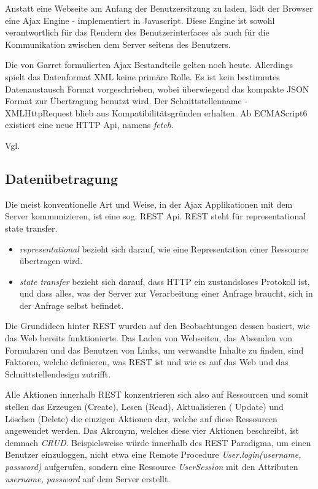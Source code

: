 Anstatt eine Webseite am Anfang der Benutzersitzung zu laden, lädt der Browser eine Ajax Engine - implementiert in Javascript. Diese Engine ist sowohl verantwortlich für das Rendern des Benutzerinterfaces als auch für die Kommunikation zwischen dem Server seitens des Benutzers.

Die von Garret formulierten Ajax Bestandteile gelten noch heute. Allerdings spielt das Datenformat XML keine primäre Rolle. Es ist kein bestimmtes Datenaustausch Format vorgeschrieben, wobei überwiegend das kompakte JSON Format zur Übertragung benutzt wird. Der Schnittstellenname - XMLHttpRequest blieb aus Kompatibilitätsgründen erhalten. Ab ECMAScript6 existiert eine neue HTTP Api, namens \emph{fetch}.

Vgl. \cite{Garrett:2005}

\subsection{Datenübetragung}

Die meist konventionelle Art und Weise, in der Ajax Applikationen mit dem Server kommunizieren, ist eine sog. REST Api. REST steht für representational state transfer.

\begin{itemize}
\item \emph{representational} bezieht sich darauf, wie eine Representation einer Ressource übertragen wird.
\item \emph{state transfer} bezieht sich darauf, dass HTTP ein zustandsloses Protokoll ist, und dass alles, was der Server zur Verarbeitung einer Anfrage braucht, sich in der Anfrage selbst befindet.
\end{itemize}

Die Grundideen hinter REST wurden auf den Beobachtungen dessen basiert, wie das Web bereits funktionierte. Das Laden von Webseiten, das Absenden von Formularen und das Benutzen von Links, um verwandte Inhalte zu finden, sind Faktoren, welche definieren, was REST ist und wie es auf das Web und das Schnittstellendesign zutrifft.

Alle Aktionen innerhalb REST konzentrieren sich also auf Ressourcen und somit stellen das Erzeugen (Create), Lesen (Read), Aktualisieren ( Update) und Löschen (Delete) die einzigen Aktionen dar, welche auf diese Ressourcen angewendet werden. Das Akronym, welches diese vier Aktionen beschreibt, ist demnach \emph{CRUD}. Beispielsweise würde innerhalb des REST Paradigma, um einen Benutzer einzuloggen, nicht etwa eine Remote Procedure \emph{User.login(username, password)} aufgerufen, sondern eine Ressource \emph{UserSession} mit den Attributen \emph{username, password} auf dem Server erstellt.


